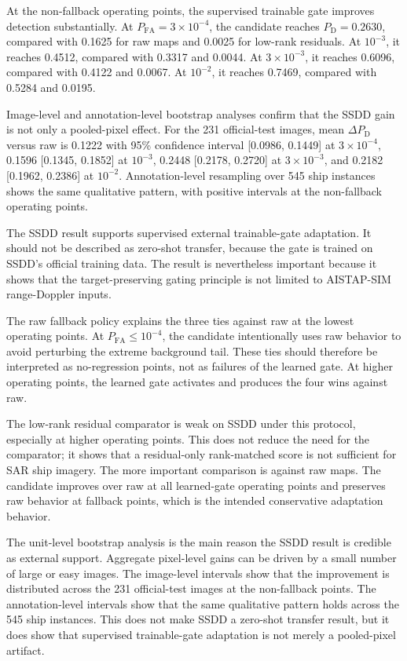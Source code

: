 \documentclass[journal]{IEEEtran}
\begin{document}
At the non-fallback operating points, the supervised trainable gate improves detection substantially. At $P_{\mathrm{FA}}=3 \times 10^{-4}$, the candidate reaches $P_{\mathrm{D}}=0.2630$, compared with 0.1625 for raw maps and 0.0025 for low-rank residuals. At $10^{-3}$, it reaches 0.4512, compared with 0.3317 and 0.0044. At $3 \times 10^{-3}$, it reaches 0.6096, compared with 0.4122 and 0.0067. At $10^{-2}$, it reaches 0.7469, compared with 0.5284 and 0.0195.

Image-level and annotation-level bootstrap analyses confirm that the SSDD gain is not only a pooled-pixel effect. For the 231 official-test images, mean $\Delta P_{\mathrm{D}}$ versus raw is 0.1222 with 95\% confidence interval [0.0986, 0.1449] at $3 \times 10^{-4}$, 0.1596 [0.1345, 0.1852] at $10^{-3}$, 0.2448 [0.2178, 0.2720] at $3 \times 10^{-3}$, and 0.2182 [0.1962, 0.2386] at $10^{-2}$. Annotation-level resampling over 545 ship instances shows the same qualitative pattern, with positive intervals at the non-fallback operating points.

The SSDD result supports supervised external trainable-gate adaptation. It should not be described as zero-shot transfer, because the gate is trained on SSDD's official training data. The result is nevertheless important because it shows that the target-preserving gating principle is not limited to AISTAP-SIM range-Doppler inputs.

The raw fallback policy explains the three ties against raw at the lowest operating points. At $P_{\mathrm{FA}} \leq 10^{-4}$, the candidate intentionally uses raw behavior to avoid perturbing the extreme background tail. These ties should therefore be interpreted as no-regression points, not as failures of the learned gate. At higher operating points, the learned gate activates and produces the four wins against raw.

The low-rank residual comparator is weak on SSDD under this protocol, especially at higher operating points. This does not reduce the need for the comparator; it shows that a residual-only rank-matched score is not sufficient for SAR ship imagery. The more important comparison is against raw maps. The candidate improves over raw at all learned-gate operating points and preserves raw behavior at fallback points, which is the intended conservative adaptation behavior.

The unit-level bootstrap analysis is the main reason the SSDD result is credible as external support. Aggregate pixel-level gains can be driven by a small number of large or easy images. The image-level intervals show that the improvement is distributed across the 231 official-test images at the non-fallback points. The annotation-level intervals show that the same qualitative pattern holds across the 545 ship instances. This does not make SSDD a zero-shot transfer result, but it does show that supervised trainable-gate adaptation is not merely a pooled-pixel artifact.
\end{document}
